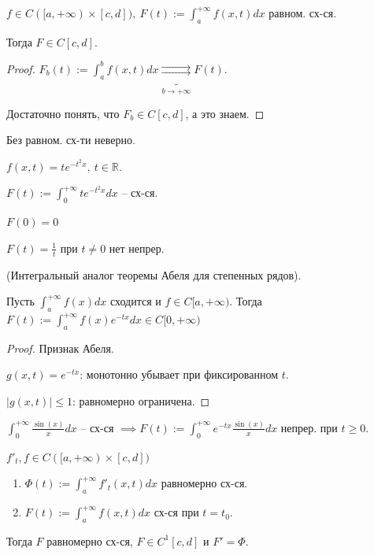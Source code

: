 \begin{theorem}
    $f \in C([a, +\infty) \times [c, d]), \ F(t) := \int_{a}^{+\infty} { f(x, t) dx }$ равном. сх-ся.

    Тогда $F \in C[c, d]$.
\end{theorem}
\begin{proof}
    $F_b(t) := \int_{a}^{b} { f(x, t) dx } \underbrace{\rightrightarrows}_{b \rightarrow +\infty} F(t)$.

    Достаточно понять, что $F_b \in C[c, d]$, а это знаем.
\end{proof}

\begin{remark}
    Без равном. сх-ти неверно.

    $f(x, t) = t e^{-t^2 x}, \ t \in \mathbb{R}$.

    $F(t) := \int_{0}^{+\infty} { t e^{-t^2 x} dx }$ -- сх-ся.

    $F(0) = 0$

    $F(t) = \frac{1}{t}$ при $t \not = 0$ нет непрер.
\end{remark}

\begin{theorem}
    (Интегральный аналог теоремы Абеля для степенных рядов).

    Пусть $\int_{a}^{+\infty} { f(x) dx }$ сходится и $f \in C[a, +\infty)$. Тогда $F(t) := \int_{a}^{+\infty} { f(x) e^{-tx} dx } \in C[0, +\infty)$
\end{theorem}

\begin{proof}
    Признак Абеля.

    $g(x, t) = e^{-tx}$: монотонно убывает при фиксированном $t$.
    
    $|g(x, t)| \leq 1$: равномерно ограничена.
\end{proof}

\begin{example}
    $\int_{0}^{+\infty} { \frac{\sin(x)}{x} dx }$ -- сх-ся $\implies F(t) := \int_{0}^{+\infty} { e^{-tx} \frac{\sin(x)}{x} dx }$ непрер. при $t \geq 0$.
\end{example}

\begin{theorem}
    $f'_t, f \in C([a, +\infty) \times [c, d])$

    \begin{enumerate}
        \item {
            $\Phi(t) := \int_{a}^{+\infty} { f'_t (x, t) dx }$ равномерно сх-ся.
        }
        \item {
            $F(t) := \int_{a}^{+\infty} { f(x, t) dx }$ сх-ся при $t = t_0$.
        }
    \end{enumerate}

    Тогда $F$ равномерно сх-ся, $F \in C^1[c, d]$ и $F' = \Phi$.
\end{theorem}

